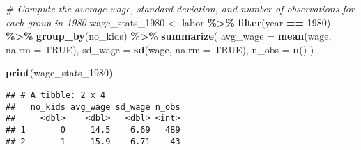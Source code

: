 \documentclass[
]{article}
\newenvironment{Shaded}{\begin{snugshade}}{\end{snugshade}}
\newcommand{\AttributeTok}[1]{\textcolor[rgb]{0.13,0.29,0.53}{#1}}
\newcommand{\CommentTok}[1]{\textcolor[rgb]{0.56,0.35,0.01}{\textit{#1}}}
\newcommand{\ConstantTok}[1]{\textcolor[rgb]{0.56,0.35,0.01}{#1}}
\newcommand{\DecValTok}[1]{\textcolor[rgb]{0.00,0.00,0.81}{#1}}
\newcommand{\FunctionTok}[1]{\textcolor[rgb]{0.13,0.29,0.53}{\textbf{#1}}}
\newcommand{\NormalTok}[1]{#1}
\newcommand{\OtherTok}[1]{\textcolor[rgb]{0.56,0.35,0.01}{#1}}
\newcommand{\SpecialCharTok}[1]{\textcolor[rgb]{0.81,0.36,0.00}{\textbf{#1}}}
\begin{document}
\begin{Shaded}
\begin{Highlighting}[]
\CommentTok{\# Compute the average wage, standard deviation, and number of observations for each group in 1980}
\NormalTok{wage\_stats\_1980 }\OtherTok{\textless{}{-}}\NormalTok{ labor }\SpecialCharTok{\%\textgreater{}\%}
  \FunctionTok{filter}\NormalTok{(year }\SpecialCharTok{==} \DecValTok{1980}\NormalTok{) }\SpecialCharTok{\%\textgreater{}\%}
  \FunctionTok{group\_by}\NormalTok{(no\_kids) }\SpecialCharTok{\%\textgreater{}\%}
  \FunctionTok{summarize}\NormalTok{(}
    \AttributeTok{avg\_wage =} \FunctionTok{mean}\NormalTok{(wage, }\AttributeTok{na.rm =} \ConstantTok{TRUE}\NormalTok{),}
    \AttributeTok{sd\_wage =} \FunctionTok{sd}\NormalTok{(wage, }\AttributeTok{na.rm =} \ConstantTok{TRUE}\NormalTok{),}
    \AttributeTok{n\_obs =} \FunctionTok{n}\NormalTok{()}
\NormalTok{  )}

\FunctionTok{print}\NormalTok{(wage\_stats\_1980)}
\end{Highlighting}
\end{Shaded}

\begin{verbatim}
## # A tibble: 2 x 4
##   no_kids avg_wage sd_wage n_obs
##     <dbl>    <dbl>   <dbl> <int>
## 1       0     14.5    6.69   489
## 2       1     15.9    6.71    43
\end{verbatim}
\end{document}
